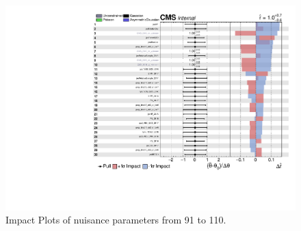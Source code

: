 \begin{figure}[!ht]
  \centering
  \includegraphics[width=\textwidth,page=4]{analysis_plots/impact_plots/impacts_datacard_run2_z.pdf}
  \caption{Impact Plots of nuisance parameters from 91 to 110.}\label{fig:vbs-impact-plots-page4}
\end{figure}
